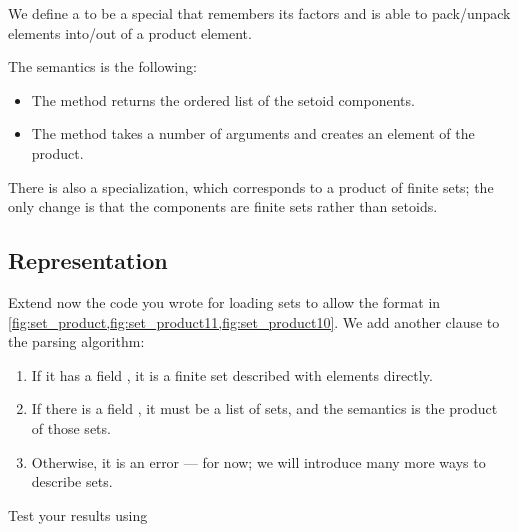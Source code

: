 
We define a  to be a special \Setoid that remembers its factors
and is able to pack/unpack elements into/out of a product element.


The semantics is the following:
\begin{itemize}
    \item The method  returns the ordered list of the setoid components.
    \item The method  takes a number of arguments and creates an element of the product.
\end{itemize}

There is also a specialization, which corresponds to a product of finite sets; the only change is that the components are finite sets rather than setoids.


\clearpage
\subsection{Representation}


%

%

\begin{codeexercise}
    Extend now the code you wrote for loading sets to allow the format in \cref{fig:set_product,fig:set_product11,fig:set_product10}.
    We add another clause to the parsing algorithm:
    \begin{enumerate}
        \item If it has a field , it is a finite set described with elements directly.
        \item If there is a field , it must be a list of sets, and the semantics is the product of those sets.
        \item Otherwise, it is an error --- for now; we will introduce many more ways to describe sets.
    \end{enumerate}
    Test your results using
\end{codeexercise}
